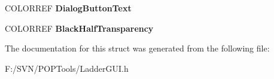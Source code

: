 \begin{DoxyCompactItemize}
\item 
\hypertarget{structt_ladder_colors_aabb1c4bdf3a464fd84006961286d6412}{C\-O\-L\-O\-R\-R\-E\-F {\bfseries Dialog\-Button\-Text}}\label{structt_ladder_colors_aabb1c4bdf3a464fd84006961286d6412}

\item 
\hypertarget{structt_ladder_colors_a142c090dea9ebfd17c88559ac025de03}{C\-O\-L\-O\-R\-R\-E\-F {\bfseries Black\-Half\-Transparency}}\label{structt_ladder_colors_a142c090dea9ebfd17c88559ac025de03}

\end{DoxyCompactItemize}


The documentation for this struct was generated from the following file\-:\begin{DoxyCompactItemize}
\item 
F\-:/\-S\-V\-N/\-P\-O\-P\-Tools/Ladder\-G\-U\-I.\-h\end{DoxyCompactItemize}
